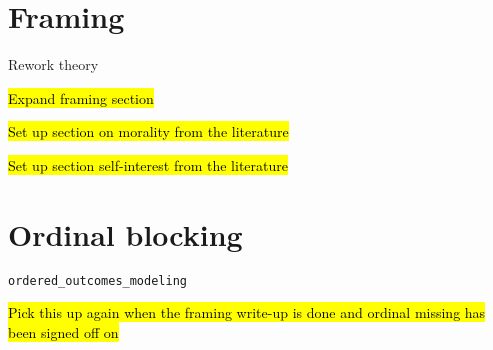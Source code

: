 \section*{Framing}
	\begin{coi}
		\item Rework theory
			\begin{coi}
				\item \hl{Expand framing section}
				\item \hl{Set up section on morality from the literature}
				\item \hl{Set up section self-interest from the literature}
			\end{coi}
	\end{coi} 

\section*{Ordinal blocking}
	\begin{coi}
		\item \texttt{ordered\_outcomes\_modeling}
			\begin{coi}
				\item \hl{Pick this up again when the framing write-up is done and ordinal missing has been signed off on}
			\end{coi}
	\end{coi}
	

	




